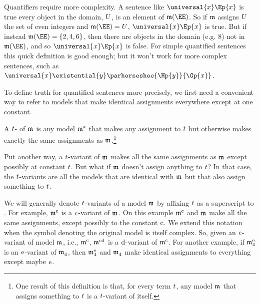 Quantifiers require more complexity. A sentence like $\universal{\variable{x}}\Ep{\variable{x}}$ is true \Iff every object in the domain, $U$, is an element of $\IntA(\EE)$. So if $\mathfrak{m}$ assigns $U$ the set of even integers and $\IntA(\EE)=\integer{U}$, $\universal{\variable{x}}\Ep{\variable{x}}$ is true. But if instead $\IntA(\EE)=\{2, 4, 6\}$, then there are objects in the domain (e.g. $8$) not in $\IntA(\EE)$, and so $\universal{\variable{x}}\Ep{\variable{x}}$ is false. For simple quantified sentences this quick definition is good enough; but it won't work for more complex sentences, such as $\universal{\variable{x}}\existential{\variable{y}}\parhorseshoe{\Hp{\variable{y}}}{\Gp{\variable{x}}}$.

To define truth for quantified sentences more precisely, we first need a convenient way to refer to models that make identical assignments everywhere except at one constant.

\begin{majorILnc}{}
A $t$- of $\As{}{}$ is any model $\mathfrak{m^{\mathrm{*}}_{\mathrm{}}}$ that makes any assignment to $t$ but otherwise makes exactly the same assignments as $\As{}{}$.\footnote{One result of this definition is that, for every term $t$, any model $\As{}{}$ that assigns something to $t$ is a $t$-variant of itself.}
\end{majorILnc}
\noindent{}Put another way, a $t$-variant of $\As{}{}$ makes all the same assignments as $\As{}{}$ except possibly at constant $t$. But what if $\As{}{}$ doesn't assign anything to $t$? In that case, the $t$-variants are all the models that are identical with $\As{}{}$ but that also assign something to $t$.

We will generally denote $t$-variants of a model $\As{}{}$ by affixing $t$ as a superscript to \mention{$\As{}{}$}. For example, $\mathfrak{m^{\mathrm{\mathrm{c}}}_{\mathrm{}}}$ is a $\mathrm{c}$-variant of $\As{}{}$.  On this example $\mathfrak{m^{\mathrm{\mathrm{c}}}_{\mathrm{}}}$ and $\As{}{}$ make all the same assignments, except possibly to the constant $\mathrm{c}$.
We extend this notation when the symbol denoting the original model is itself complex.
So, given an $\mathrm{c}$-variant of model $\As{}{}$, i.e., $\mathfrak{m^{\mathrm{\mathrm{c}}}_{\mathrm{}}}$, $\mathfrak{m^{\mathrm{\mathrm{cd}}}_{\mathrm{}}}$ is a $\mathrm{d}$-variant of $\mathfrak{m^{\mathrm{\mathrm{c}}}_{\mathrm{}}}$.  For another example, if $\mathfrak{m^{\mathrm{\mathrm{e}}}_{\mathrm{4}}}$ is an $\mathrm{e}$-variant of $\mathfrak{m^{\mathrm{}}_{\mathrm{4}}}$, then $\mathfrak{m^{\mathrm{\mathrm{e}}}_{\mathrm{4}}}$ and $\mathfrak{m^{\mathrm{}}_{\mathrm{4}}}$ make identical assignments to everything except maybe $\mathrm{e}$. 

